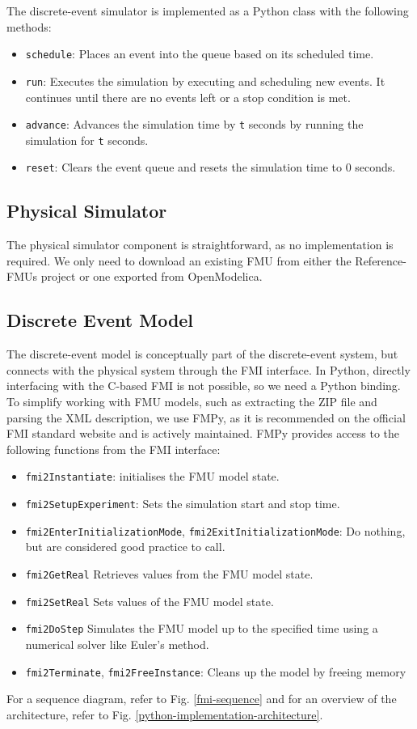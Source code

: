 \documentclass[conference]{IEEEtran}
\begin{document}
The discrete-event simulator is implemented as a Python class with the following methods:
\begin{itemize}
    \item \texttt{schedule}: Places an event into the queue based on its scheduled time.
    \item \texttt{run}: Executes the simulation by executing and scheduling new events. It continues until there are no events left or a stop condition is met.
    \item \texttt{advance}: Advances the simulation time by \texttt{t} seconds by running the simulation for \texttt{t} seconds.
    \item \texttt{reset}: Clears the event queue and resets the simulation time to 0 seconds.
\end{itemize}

\subsection{Physical Simulator}

The physical simulator component is straightforward, as no implementation is required. We only need to download an existing FMU from either the Reference-FMUs project or one exported from OpenModelica.

\subsection{Discrete Event Model}

The discrete-event model is conceptually part of the discrete-event system,
but connects with the physical system through the FMI interface.
In Python, directly interfacing with the C-based FMI is not possible,
so we need a Python binding.
To simplify working with FMU models, such as extracting the ZIP file and parsing the XML description, we use FMPy,
as it is recommended on the official FMI standard website
and is actively maintained.
FMPy provides access to the following functions from the FMI interface:
\begin{itemize}
    \item \texttt{fmi2Instantiate}: initialises the FMU model state.
    \item \texttt{fmi2SetupExperiment}: Sets the simulation start and stop time.
    \item \texttt{fmi2EnterInitializationMode}, \texttt{fmi2ExitInitializationMode}: Do nothing, but are considered good practice to call.
    \item \texttt{fmi2GetReal} Retrieves values from the FMU model state.
    \item \texttt{fmi2SetReal} Sets values of the FMU model state.
    \item \texttt{fmi2DoStep} Simulates the FMU model up to the specified time using a numerical solver like Euler's method.
    \item \texttt{fmi2Terminate}, \texttt{fmi2FreeInstance}: Cleans up the model by freeing memory 
    
\end{itemize}
For a sequence diagram, refer to Fig. \ref{fmi-sequence} and
for an overview of the architecture, refer to Fig. \ref{python-implementation-architecture}.
\end{document}
